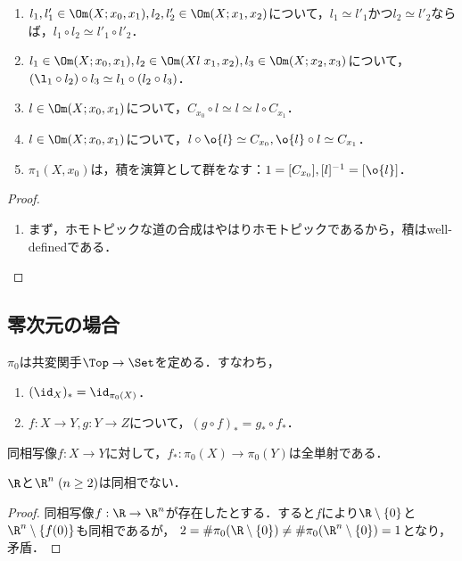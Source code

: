 \documentclass[uplatex, dvipdfmx]{jsreport}
\begin{document}
\begin{lemma}\mbox{}
    \begin{enumerate}
        \item $l_1,l'_1\in\Om(X;x_0,x_1),l_2,l'_2\in\Om(X;x_1,x_2)$について，$l_1\simeq l'_1$かつ$l_2\simeq l'_2$ならば，$l_1\circ l_2\simeq l'_1\circ l'_2$．
        \item $l_1\in\Om(X;x_0,x_1),l_2\in\Om(Xl\;x_1,x_2),l_3\in\Om(X;x_2,x_3)$について，$(\l_1\circ l_2)\circ l_3\simeq l_1\circ(l_2\circ l_3)$．
        \item $l\in\Om(X;x_0,x_1)$について，$C_{x_0}\circ l\simeq l\simeq l\circ C_{x_1}$．
        \item $l\in\Om(X;x_0,x_1)$について，$l\circ\o{l}\simeq C_{x_0},\o{l}\circ l\simeq C_{x_1}$．
        \item $\pi_1(X,x_0)$は，積を演算として群をなす：$1=[C_{x_0}],[l]^{-1}=[\o{l}]$．
    \end{enumerate}
\end{lemma}
\begin{proof}\mbox{}
    \begin{enumerate}
        \item まず，ホモトピックな道の合成はやはりホモトピックであるから，積はwell-definedである．
    \end{enumerate}
\end{proof}

\subsection{零次元の場合}

\begin{lemma}
    $\pi_0$は共変関手$\Top\to\Set$を定める．すなわち，
    \begin{enumerate}
        \item $(\id_X)_*=\id_{\pi_0(X)}$．
        \item $f:X\to Y,g:Y\to Z$について，$(g\circ f)_*=g_*\circ f_*$．
    \end{enumerate}
\end{lemma}

\begin{proposition}
    同相写像$f:X\to Y$に対して，$f_*:\pi_0(X)\to\pi_0(Y)$は全単射である．
\end{proposition}

\begin{corollary}
    $\R$と$\R^n\;(n\ge 2)$は同相でない．
\end{corollary}
\begin{proof}
    同相写像$f:\R\to\R^n$が存在したとする．すると$f$により$\R\setminus\{0\}$と$\R^n\setminus\{f(0)\}$も同相であるが，
    $2=\#\pi_0(\R\setminus\{0\})\ne\#\pi_0(\R^n\setminus\{0\})=1$となり，矛盾．
\end{proof}
\end{document}
